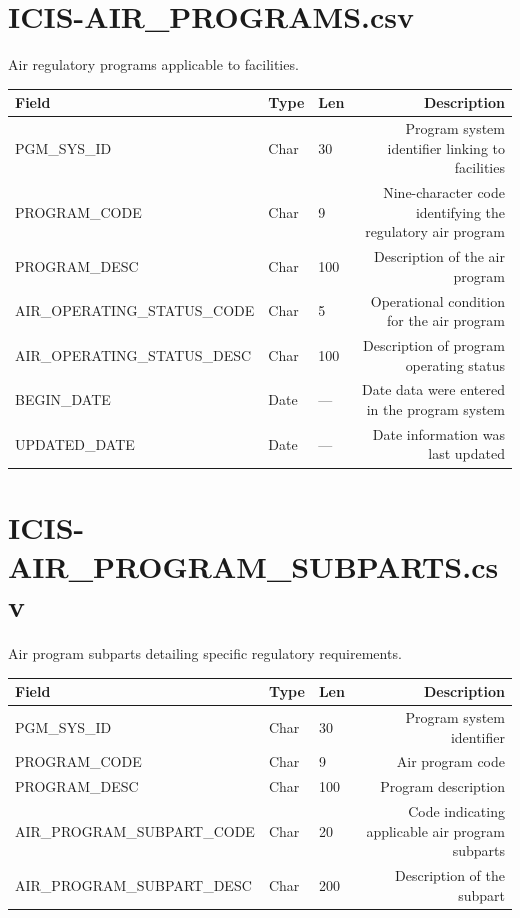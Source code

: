 \documentclass[11pt]{article}
\begin{document}
\section*{ICIS-AIR\_PROGRAMS.csv}
Air regulatory programs applicable to facilities.
\begin{longtable}{F T L D}
\toprule
Field & Type & Len & Description \\ \midrule \endhead
PGM\_SYS\_ID & Char & 30 & Program system identifier linking to facilities \\
PROGRAM\_CODE & Char & 9 & Nine-character code identifying the regulatory air program \\
PROGRAM\_DESC & Char & 100 & Description of the air program \\
AIR\_OPERATING\_STATUS\_CODE & Char & 5 & Operational condition for the air program \\
AIR\_OPERATING\_STATUS\_DESC & Char & 100 & Description of program operating status \\
BEGIN\_DATE & Date & --- & Date data were entered in the program system \\
UPDATED\_DATE & Date & --- & Date information was last updated \\
\bottomrule
\end{longtable}

\section*{ICIS-AIR\_PROGRAM\_SUBPARTS.csv}
Air program subparts detailing specific regulatory requirements.
\begin{longtable}{F T L D}
\toprule
Field & Type & Len & Description \\ \midrule \endhead
PGM\_SYS\_ID & Char & 30 & Program system identifier \\
PROGRAM\_CODE & Char & 9 & Air program code \\
PROGRAM\_DESC & Char & 100 & Program description \\
AIR\_PROGRAM\_SUBPART\_CODE & Char & 20 & Code indicating applicable air program subparts \\
AIR\_PROGRAM\_SUBPART\_DESC & Char & 200 & Description of the subpart \\
\bottomrule
\end{longtable}
\end{document}
